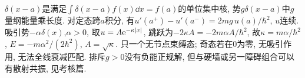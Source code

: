 $\delta(x-a)$是满足$\int\delta(x-a)f(x)\dd x=f(a)$的单位集中核, 势$g\delta(x-a)$中$g$量纲能量乘长度. 对定态跨$a$积分, 有$u'(a^+)-u'(a^-)=2mg\,u(a)/\hbar^2$, $u$连续. 吸引势$-\alpha\delta(x)$,$\alpha>0$, 取$u=A\mathrm e^{-\kappa|x|}$, 跳跃为$-2\kappa A=-2m\alpha A/\hbar^2$, 故$\kappa=m\alpha/\hbar^2$, $E=-m\alpha^2/(2\hbar^2)$, $A=\sqrt\kappa$. 只一个无节点束缚态; 奇态若在0为零, 无吸引作用, 无法全线衰减匹配. 排斥$g>0$没有负能正规解, 但与硬墙或另一障碍组合可以有散射共振, 见考核篇.
